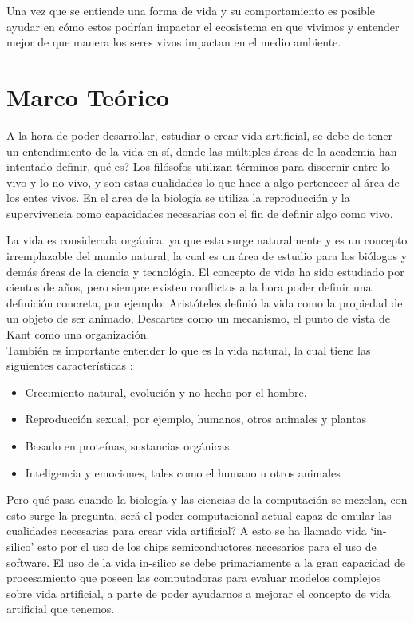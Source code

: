 \documentclass[conference]{IEEEtran}
\begin{document}
Una vez que se entiende una forma de vida y su comportamiento es posible ayudar en c\'omo estos podr\'ian impactar el ecosistema en que vivimos y entender mejor de que manera los seres vivos impactan en el medio ambiente.



\section{Marco Te\'orico}



A la hora de poder desarrollar, estudiar o crear vida artificial, se debe de tener un entendimiento de la vida en s\'i, donde las m\'ultiples \'areas de la academia han intentado definir, qu\'e es? Los fil\'osofos utilizan t\'erminos para discernir entre lo vivo y lo no-vivo, y son estas cualidades lo que hace a algo pertenecer al \'area de los entes vivos. \cite{lifeStanfordPhi} En el area de la biolog\'ia se utiliza la reproducci\'on y la supervivencia \cite{artificiallifeLevy} como capacidades necesarias con el fin de definir algo como vivo. 

La vida es considerada org\'anica, ya que esta surge naturalmente y es un concepto irremplazable del mundo natural, la cual es un \'area de estudio para los bi\'ologos y dem\'as \'areas de la ciencia y tecnol\'ogia. El concepto de vida ha sido estudiado por cientos de a\~nos, pero siempre existen conflictos a la hora poder definir una definici\'on concreta, por ejemplo: Arist\'oteles defini\'o la vida como la propiedad de un objeto de ser animado, Descartes como un mecanismo, el punto de vista de Kant como una organizaci\'on. \cite{lifeStanfordPhi} \\
Tambi\'en es importante entender lo que es la vida natural, la cual tiene las siguientes caracter\'isticas \cite{XUY01} :
\begin{itemize}
\item Crecimiento natural, evoluci\'on y no hecho por el hombre.
\item Reproducci\'on sexual, por ejemplo, humanos, otros animales y plantas
\item Basado en prote\'inas, sustancias org\'anicas.
\item Inteligencia y emociones, tales como el humano u otros animales
\end{itemize}

Pero qu\'e pasa cuando la biolog\'ia y las ciencias de la computaci\'on se mezclan, con esto surge la pregunta, ser\'a el poder computacional actual capaz de emular las cualidades necesarias para crear vida artificial? A esto se ha llamado vida `in-silico' \cite{artificiallifeLevy, lifeStanfordPhi} esto por el uso de los chips semiconductores necesarios para el uso de software. El uso de la vida in-silico se debe primariamente a la gran capacidad de procesamiento que poseen las computadoras para evaluar modelos complejos sobre vida artificial, a parte de poder ayudarnos a mejorar el concepto de vida artificial que tenemos. 
\end{document}
